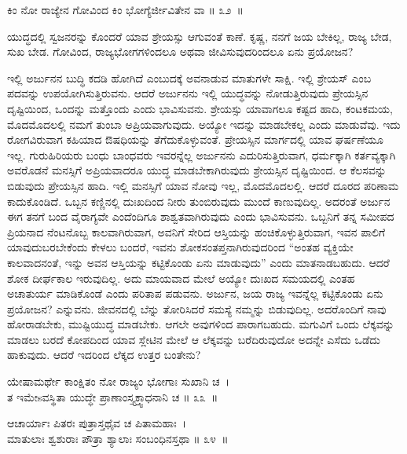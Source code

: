 \begin{shloka}
ಕಿಂ ನೋ ರಾಜ್ಯೇನ ಗೋವಿಂದ ಕಿಂ ಭೋಗ್ಯೆರ್ಜೀವಿತೇನ ವಾ \hfill॥ ೩೨~॥
\end{shloka}

\begin{artha}
ಯುದ್ಧದಲ್ಲಿ ಸ್ವಜನರನ್ನು ಕೊಂದರೆ ಯಾವ ಶ್ರೇಯಸ್ಸು ಆಗುವಂತೆ ಕಾಣೆ. ಕೃಷ್ಣ, ನನಗೆ ಜಯ ಬೇಕಿಲ್ಲ, ರಾಜ್ಯ ಬೇಡ, ಸುಖ ಬೇಡ. ಗೋವಿಂದ, ರಾಜ್ಯಭೋಗಗಳಿಂದಲೂ ಅಥವಾ ಜೀವಿಸುವುದರಿಂದಲೂ ಏನು ಪ್ರಯೋಜನ?
\end{artha}

ಇಲ್ಲಿ ಅರ್ಜುನನ ಬುದ್ಧಿ ಕದಡಿ ಹೋಗಿದೆ ಎಂಬುದಕ್ಕೆ ಅವನಾಡುವ ಮಾತುಗಳೇ ಸಾಕ್ಷಿ. ಇಲ್ಲಿ ಶ್ರೇಯಸ್ ಎಂಬ ಪದವನ್ನು ಉಪಯೋಗಿಸುತ್ತಿರುವನು. ಆದರೆ ಅರ್ಜುನನು ಇಲ್ಲಿ ಯುದ್ಧವನ್ನು ನೋಡುತ್ತಿರುವುದು ಪ್ರೇಯಸ್ಸಿನ ದೃಷ್ಟಿಯಿಂದ, ಒಂದನ್ನು ಮತ್ತೊಂದು ಎಂದು ಭಾವಿಸುವನು. ಶ್ರೇಯಸ್ಸು ಯಾವಾಗಲೂ ಕಷ್ಟದ ಹಾದಿ, ಕಂಟಕಮಯ, ಮೊದಮೊದಲಲ್ಲಿ ನಮಗೆ ತುಂಬಾ ಅಪ್ರಿಯವಾಗುವುದು. ಅಯ್ಯೋ ಇದನ್ನು ಮಾಡಬೇಕಲ್ಲ ಎಂದು ಮಾಡುವೆವು. ಇದು ರೋಗವಿರುವಾಗ ಕಹಿಯಾದ ಔಷಧಿಯನ್ನು ತೆಗೆದುಕೊಳ್ಳುವಂತೆ. ಪ್ರೇಯಸ್ಸಿನ ಮಾರ್ಗದಲ್ಲಿ ಯಾವ ಘರ್ಷಣೆಯೂ ಇಲ್ಲ. ಗುರುಹಿರಿಯರು ಬಂಧು ಬಾಂಧವರು ಇವರನ್ನೆಲ್ಲ ಅರ್ಜುನನು ಎದುರಿಸುತ್ತಿರುವಾಗ, ಧರ್ಮಕ್ಕಾಗಿ ಕರ್ತವ್ಯಕ್ಕಾಗಿ ಅವರೊಡನೆ ಮನಸ್ಸಿಗೆ ಅಪ್ರಿಯವಾದರೂ ಯುದ್ಧ ಮಾಡಬೇಕಾಗಿರುವುದು ಶ್ರೇಯಸ್ಸಿನ ದೃಷ್ಟಿಯಿಂದ. ಆ ಕೆಲಸವನ್ನು ಬಿಡುವುದು ಪ್ರೇಯಸ್ಸಿನ ಹಾದಿ. ಇಲ್ಲಿ ಮನಸ್ಸಿಗೆ ಯಾವ ನೋವು ಇಲ್ಲ, ಮೊದಮೊದಲಲ್ಲಿ. ಆದರೆ ದೂರದ ಪರಿಣಾಮ ಕಾದುಕೊಂಡಿದೆ. ಒಬ್ಬನ ಕಣ್ಣಿನಲ್ಲಿ ದುಃಖದಿಂದ ನೀರು ತುಂಬಿರುವುದು ಮುಂದೆ ಕಾಣುವುದಿಲ್ಲ. ಅದರಂತೆ ಅರ್ಜುನ ಈಗ ತನಗೆ ಬಂದ ವೈರಾಗ್ಯವೇ ಎಂದೆಂದಿಗೂ ಶಾಶ್ವತವಾಗಿರುವುದು ಎಂದು ಭಾವಿಸುವನು. ಒಬ್ಬನಿಗೆ ತನ್ನ ಸಮೀಪದ ಪ್ರಿಯನಾದ ನೆಂಟನೊಬ್ಬ ಕಾಲವಾಗಿರುವಾಗ, ಅವನಿಗೆ ಸೇರಿದ ಆಸ್ತಿಯನ್ನು ಹಂಚಿಕೊಳ್ಳುತ್ತಿರುವಾಗ, ಇವನ ಪಾಲಿಗೆ ಯಾವುದು\break ಬರಬೇಕೆಂದು ಕೇಳಲು ಬಂದರೆ, ಇವನು ಶೋಕಸಂತಪ್ತನಾಗಿರುವುದರಿಂದ “ಅಂತಹ ವ್ಯಕ್ತಿಯೇ ಕಾಲವಾದನಂತೆ, ಇನ್ನು ಅವನ ಆಸ್ತಿಯನ್ನು ಕಟ್ಟಿಕೊಂಡು ಏನು ಮಾಡುವುದು” ಎಂದು ಮಾತನಾಡಬಹುದು. ಆದರೆ ಶೋಕ ದೀರ್ಘಕಾಲ ಇರುವುದಿಲ್ಲ. ಅದು ಮಾಯವಾದ ಮೇಲೆ ಅಯ್ಯೋ ದುಃಖದ ಸಮಯದಲ್ಲಿ ಎಂತಹ ಅಚಾತುರ್ಯ ಮಾಡಿಕೊಂಡೆ ಎಂದು ಪರಿತಾಪ ಪಡುವನು. ಅರ್ಜುನ, ಜಯ ರಾಜ್ಯ ಇವನ್ನೆಲ್ಲ ಕಟ್ಟಿಕೊಂಡು ಏನು ಪ್ರಯೋಜನ? ಎನ್ನುವನು. ಜೀವನದಲ್ಲಿ ಬೆನ್ನು ತೋರಿಸಿದರೆ ಸಮಸ್ಯೆ ನಮ್ಮನ್ನು ಬಿಡುವುದಿಲ್ಲ. ಅದರೊಂದಿಗೆ ನಾವು ಹೋರಾಡಬೇಕು, ಮುಷ್ಟಿಯುದ್ಧ ಮಾಡಬೇಕು. ಆಗಲೇ ಅವುಗಳಿಂದ ಪಾರಾಗಬಹುದು. ಮಗುವಿಗೆ ಒಂದು ಲೆಕ್ಕವನ್ನು ಮಾಡಲು ಬರದೆ ಕೋಪದಿಂದ ಯಾವ ಸ್ಲೇಟಿನ ಮೇಲೆ ಆ ಲೆಕ್ಕವನ್ನು ಬರೆದಿರುವುದೋ ಅದನ್ನೇ ಎಸೆದು ಒಡೆದು ಹಾಕುವುದು. ಆದರೆ ಇದರಿಂದ ಲೆಕ್ಕದ ಉತ್ತರ ಬಂತೇನು?

\begin{shloka}
ಯೇಷಾಮರ್ಥೇ ಕಾಂಕ್ಷಿತಂ ನೋ ರಾಜ್ಯಂ ಭೋಗಾಃ ಸುಖಾನಿ ಚ~।\\ತ ಇಮೇsವಸ್ಥಿತಾ ಯುದ್ಧೇ ಪ್ರಾಣಾಂಸ್ತ್ಯಕ್ತ್ವಾಧನಾನಿ ಚ \hfill॥ ೩೩~॥
\end{shloka}

\begin{shloka}
ಆಚಾರ್ಯಾಃ ಪಿತರಃ ಪುತ್ರಾಸ್ತಥೈವ ಚ ಪಿತಾಮಹಾಃ~।\\ಮಾತುಲಾಃ ಶ್ವಶುರಾಃ ಪೌತ್ರಾ ಶ್ಯಾಲಾಃ ಸಂಬಂಧಿನಸ್ತಥಾ \hfill॥ ೩೪~॥
\end{shloka}

